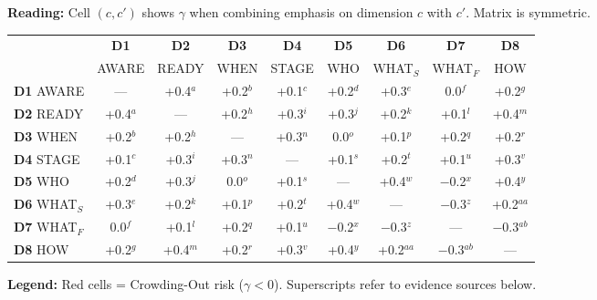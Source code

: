 \begin{tcolorbox}[colback=green!5!white, colframe=green!75!black,
    title=\textbf{The $\gamma_{cc'}$ Matrix (10C Dimensional Complementarity)}]

\textbf{Reading:} Cell $(c,c')$ shows $\gamma$ when combining emphasis on dimension $c$ with $c'$. Matrix is symmetric.

\begin{center}
\footnotesize
\renewcommand{\arraystretch}{1.1}
\begin{tabular}{@{}l|cccccccc@{}}
\toprule
& \textbf{D1} & \textbf{D2} & \textbf{D3} & \textbf{D4} & \textbf{D5} & \textbf{D6} & \textbf{D7} & \textbf{D8} \\
& AWARE & READY & WHEN & STAGE & WHO & WHAT$_S$ & WHAT$_F$ & HOW \\
\midrule
\textbf{D1} AWARE       & ---      & +0.4$^a$ & +0.2$^b$ & +0.1$^c$ & +0.2$^d$ & +0.3$^e$ & 0.0$^f$  & +0.2$^g$ \\
\textbf{D2} READY       & +0.4$^a$ & ---      & +0.2$^h$ & +0.3$^i$ & +0.3$^j$ & +0.2$^k$ & +0.1$^l$ & +0.4$^m$ \\
\textbf{D3} WHEN        & +0.2$^b$ & +0.2$^h$ & ---      & +0.3$^n$ & 0.0$^o$  & +0.1$^p$ & +0.2$^q$ & +0.2$^r$ \\
\textbf{D4} STAGE       & +0.1$^c$ & +0.3$^i$ & +0.3$^n$ & ---      & +0.1$^s$ & +0.2$^t$ & +0.1$^u$ & +0.3$^v$ \\
\textbf{D5} WHO         & +0.2$^d$ & +0.3$^j$ & 0.0$^o$  & +0.1$^s$ & ---      & +0.4$^w$ & \cellcolor{red!20}$-$0.2$^x$ & +0.4$^y$ \\
\textbf{D6} WHAT$_S$    & +0.3$^e$ & +0.2$^k$ & +0.1$^p$ & +0.2$^t$ & +0.4$^w$ & ---      & \cellcolor{red!20}$-$0.3$^z$ & +0.2$^{aa}$ \\
\textbf{D7} WHAT$_F$    & 0.0$^f$  & +0.1$^l$ & +0.2$^q$ & +0.1$^u$ & \cellcolor{red!20}$-$0.2$^x$ & \cellcolor{red!20}$-$0.3$^z$ & ---      & \cellcolor{red!20}$-$0.3$^{ab}$ \\
\textbf{D8} HOW         & +0.2$^g$ & +0.4$^m$ & +0.2$^r$ & +0.3$^v$ & +0.4$^y$ & +0.2$^{aa}$ & \cellcolor{red!20}$-$0.3$^{ab}$ & --- \\
\bottomrule
\end{tabular}
\end{center}

\textbf{Legend:} \colorbox{red!20}{Red cells} = Crowding-Out risk ($\gamma < 0$). Superscripts refer to evidence sources below.

\end{tcolorbox}

